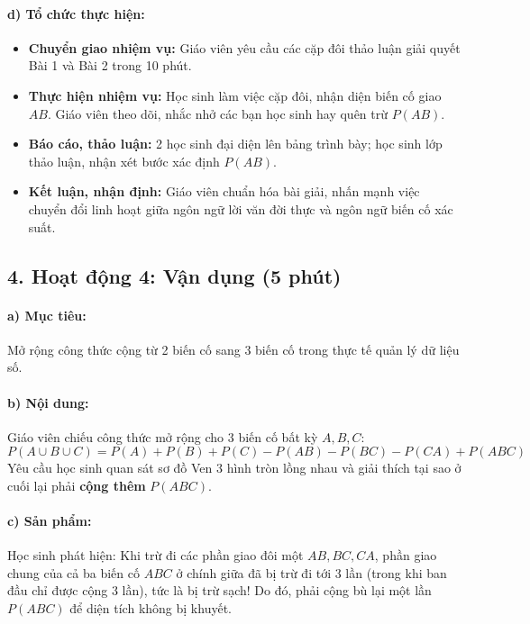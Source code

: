 \documentclass[12pt, a4paper]{article}
\begin{document}
\paragraph{d) Tổ chức thực hiện:}
\begin{itemize}[leftmargin=0.8cm]
    \item \textbf{Chuyển giao nhiệm vụ:} Giáo viên yêu cầu các cặp đôi thảo luận giải quyết Bài 1 và Bài 2 trong 10 phút.
    \item \textbf{Thực hiện nhiệm vụ:} Học sinh làm việc cặp đôi, nhận diện biến cố giao $AB$. Giáo viên theo dõi, nhắc nhở các bạn học sinh hay quên trừ $P(AB)$.
    \item \textbf{Báo cáo, thảo luận:} 2 học sinh đại diện lên bảng trình bày; học sinh lớp thảo luận, nhận xét bước xác định $P(AB)$.
    \item \textbf{Kết luận, nhận định:} Giáo viên chuẩn hóa bài giải, nhấn mạnh việc chuyển đổi linh hoạt giữa ngôn ngữ lời văn đời thực và ngôn ngữ biến cố xác suất.
\end{itemize}

\subsection*{4. Hoạt động 4: Vận dụng (5 phút)}

\paragraph{a) Mục tiêu:} Mở rộng công thức cộng từ 2 biến cố sang 3 biến cố trong thực tế quản lý dữ liệu số.

\paragraph{b) Nội dung:} Giáo viên chiếu công thức mở rộng cho 3 biến cố bất kỳ $A, B, C$:
$$P(A \cup B \cup C) = P(A) + P(B) + P(C) - P(AB) - P(BC) - P(CA) + P(ABC)$$
Yêu cầu học sinh quan sát sơ đồ Ven 3 hình tròn lồng nhau và giải thích tại sao ở cuối lại phải \textbf{cộng thêm} $P(ABC)$.

\paragraph{c) Sản phẩm:} Học sinh phát hiện: Khi trừ đi các phần giao đôi một $AB, BC, CA$, phần giao chung của cả ba biến cố $ABC$ ở chính giữa đã bị trừ đi tới 3 lần (trong khi ban đầu chỉ được cộng 3 lần), tức là bị trừ sạch! Do đó, phải cộng bù lại một lần $P(ABC)$ để diện tích không bị khuyết.
\end{document}
